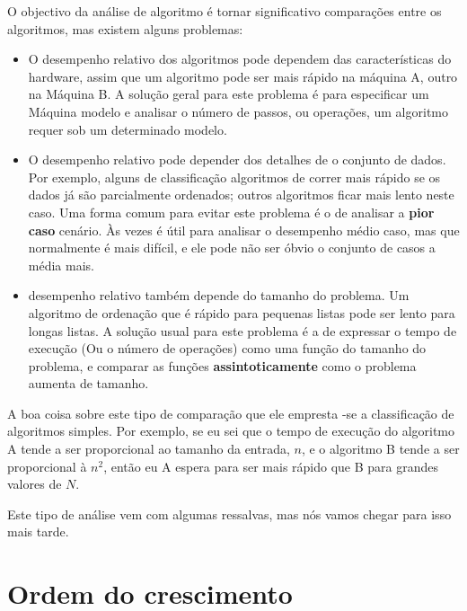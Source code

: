 \documentclass[10pt]{book}
\begin{document}
\begin{exercise}
\begin{v erbatim}
O objectivo da análise de algoritmo é tornar significativo
comparações entre os algoritmos, mas existem alguns problemas:

\begin{itemize}

\item O desempenho relativo dos algoritmos pode
dependem das características do hardware, assim que um algoritmo
pode ser mais rápido na máquina A, outro na Máquina B.
A solução geral para este problema é para especificar um
{Máquina modelo \bf} e analisar o número de passos, ou
operações, um algoritmo requer sob um determinado modelo.

\item O desempenho relativo pode depender dos detalhes de
o conjunto de dados. Por exemplo, alguns de classificação
algoritmos de correr mais rápido se os dados já são parcialmente ordenados;
outros algoritmos ficar mais lento neste caso.
Uma forma comum para evitar este problema é o de analisar a
{\bf pior caso} cenário. Às vezes é útil para
analisar o desempenho médio caso, mas que normalmente é mais difícil,
e ele pode não ser óbvio o conjunto de casos a média mais.

\item desempenho relativo também depende do tamanho do
problema. Um algoritmo de ordenação que é rápido para pequenas listas
pode ser lento para longas listas.
A solução usual para este problema é a de expressar o tempo de execução
(Ou o número de operações) como uma função do tamanho do problema,
e comparar as funções {\bf assintoticamente} como o problema
aumenta de tamanho.

\end{itemize}

A boa coisa sobre este tipo de comparação que ele empresta
-se a classificação de algoritmos simples. Por exemplo,
se eu sei que o tempo de execução do algoritmo A tende a ser
proporcional ao tamanho da entrada, $ n $, e o algoritmo B
tende a ser proporcional à $ n ^ 2 $, então eu
A espera para ser mais rápido que B para grandes valores de $ N $.

Este tipo de análise vem com algumas ressalvas, mas nós vamos chegar
para isso mais tarde.


\section{Ordem do crescimento}


\end{v erbatim}
\end{exercise}
\end{document}
